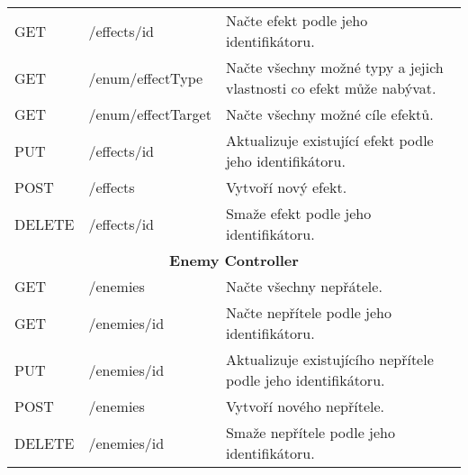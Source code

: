 \begin{longtable}{|l|l|p{}|}
    GET             & /effects/{id}               & Načte efekt podle jeho identifikátoru.                                                                                                     \\
    GET             & /enum/effectType            & Načte všechny možné typy a jejich vlastnosti co efekt může nabývat.                                                                        \\
    GET             & /enum/effectTarget          & Načte všechny možné cíle efektů.                                                                                                           \\
    PUT             & /effects/{id}               & Aktualizuje existující efekt podle jeho identifikátoru.                                                                                    \\
    POST            & /effects                    & Vytvoří nový efekt.                                                                                                                        \\
    DELETE          & /effects/{id}               & Smaže efekt podle jeho identifikátoru.                                                                                                     \\
    \hline
    \multicolumn{3}{|c|}{\textbf{Enemy Controller}}                                                                                                                                            \\
    \hline
    GET             & /enemies                    & Načte všechny nepřátele.                                                                                                                   \\
    GET             & /enemies/{id}               & Načte nepřítele podle jeho identifikátoru.                                                                                                 \\
    PUT             & /enemies/{id}               & Aktualizuje existujícího nepřítele podle jeho identifikátoru.                                                                              \\
    POST            & /enemies                    & Vytvoří nového nepřítele.                                                                                                                  \\
    DELETE          & /enemies/{id}               & Smaže nepřítele podle jeho identifikátoru.                                                                                                 \\

\end{longtable}
